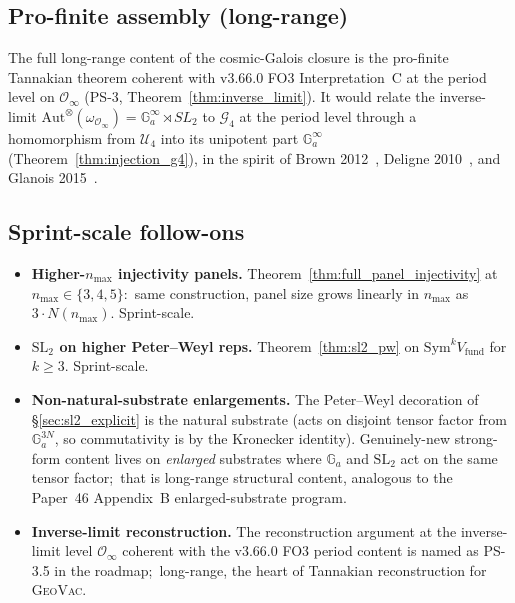 \documentclass[11pt,a4paper]{article}
\theoremstyle{plain}
\theoremstyle{definition}
\newcommand{\nmax}{n_{\max}}
\newcommand{\Ginf}{\mathcal{O}_{\infty}}
\newcommand{\Aut}{\mathrm{Aut}}
\newcommand{\SL}{\mathrm{SL}}
\newcommand{\Ga}{\mathbb{G}_{a}}
\newcommand{\fibfun}{\omega}
\begin{document}
\subsection{Pro-finite assembly (long-range)}\label{sec:open_profinite}

The full long-range content of the cosmic-Galois closure is the
pro-finite Tannakian theorem coherent with v3.66.0 FO3
Interpretation~C at the period level on $\Ginf$ (PS-3,
Theorem~\ref{thm:inverse_limit}). It would relate the inverse-limit
$\Aut^{\otimes}(\fibfun_{\Ginf}) = \Ga^{\infty} \rtimes SL_{2}$ to
$\mathcal{G}_4$ at the period level through a homomorphism from
$\mathcal{U}_4$ into its unipotent part $\Ga^{\infty}$
(Theorem~\ref{thm:injection_g4}), in
the spirit of Brown 2012~\cite{brown2012}, Deligne
2010~\cite{deligne2010}, and Glanois 2015~\cite{glanois2015}.

\subsection{Sprint-scale follow-ons}\label{sec:open_sprint}

\begin{itemize}
\item \textbf{Higher-$\nmax$ injectivity panels.} Theorem~\ref{thm:full_panel_injectivity}
  at $\nmax \in \{3, 4, 5\}$:\ same construction, panel size grows
  linearly in $\nmax$ as $3 \cdot N(\nmax)$. Sprint-scale.
\item \textbf{$\SL_{2}$ on higher Peter--Weyl reps.} Theorem~\ref{thm:sl2_pw}
  on $\mathrm{Sym}^{k} V_{\mathrm{fund}}$ for $k \ge 3$. Sprint-scale.
\item \textbf{Non-natural-substrate enlargements.} The Peter--Weyl
  decoration of §\ref{sec:sl2_explicit} is the natural substrate
  (acts on disjoint tensor factor from $\Ga^{3 N}$, so commutativity
  is by the Kronecker identity). Genuinely-new strong-form content
  lives on \emph{enlarged} substrates where $\Ga$ and $\SL_{2}$ act
  on the same tensor factor;\ that is long-range structural content,
  analogous to the Paper~46 Appendix~B enlarged-substrate program.
\item \textbf{Inverse-limit reconstruction.} The reconstruction
  argument at the inverse-limit level $\Ginf$ coherent with the
  v3.66.0 FO3 period content is named as PS-3.5 in the roadmap;\
  long-range, the heart of Tannakian reconstruction for \textsc{GeoVac}.
\end{itemize}

\end{document}
